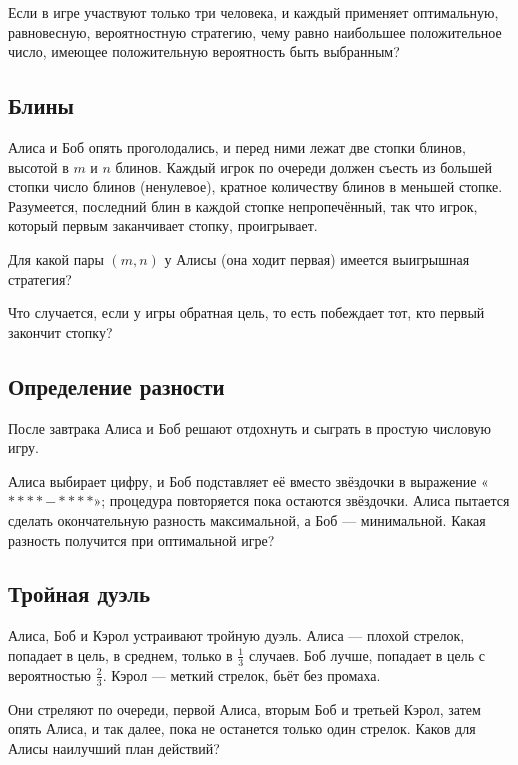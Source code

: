 Если в игре участвуют только три человека, и каждый применяет оптимальную, равновесную, вероятностную стратегию, чему равно наибольшее положительное число, имеющее положительную вероятность быть выбранным?

\subsection*{Блины}%

Алиса и Боб опять проголодались, и перед ними лежат две стопки блинов, высотой в $m$ и $n$ блинов.
Каждый игрок по очереди должен съесть из большей стопки число блинов (ненулевое), кратное количеству блинов в меньшей стопке.
Разумеется, последний блин в каждой стопке непропечённый, так что игрок, который первым заканчивает стопку, проигрывает.

Для какой пары $(m,n)$ у Алисы (она ходит первая) имеется выигрышная стратегия?

Что случается, если у игры обратная цель, то есть побеждает тот, кто первый закончит стопку?

\subsection*{Определение разности}%

После завтрака Алиса и Боб решают отдохнуть и сыграть в простую числовую игру.

\medskip

Алиса выбирает цифру, и Боб подставляет её вместо звёздочки в выражение «$**** - ****$»; процедура повторяется пока остаются звёздочки. 
Алиса пытается сделать окончательную разность максимальной, а Боб --- минимальной.
Какая разность получится при оптимальной игре?

\subsection*{Тройная дуэль}%

Алиса, Боб и Кэрол устраивают тройную дуэль.
Алиса --- плохой стрелок, попадает в цель, в среднем, только в $\tfrac13$ случаев.
Боб лучше, попадает в цель с вероятностью $\tfrac23$.
Кэрол --- меткий стрелок, бьёт без промаха.

Они стреляют по очереди, первой Алиса, вторым Боб и третьей Кэрол, затем опять Алиса, и так далее, пока не останется только один стрелок.
Каков для Алисы наилучший план действий?

